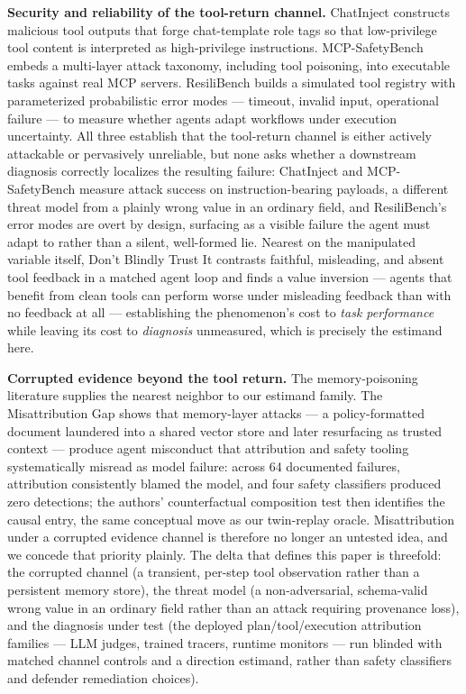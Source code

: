 \documentclass[11pt]{article}
\begin{document}
\textbf{Security and reliability of the tool-return channel.} ChatInject \citep{ChatInjectWVhgFSKniL} constructs malicious tool outputs that forge chat-template role tags so that low-privilege tool content is interpreted as high-privilege instructions. MCP-SafetyBench \citep{MCPSafetyBench7XYjeL46co} embeds a multi-layer attack taxonomy, including tool poisoning, into executable tasks against real MCP servers. ResiliBench \citep{ResiliBenchKTZ56LG7jZ} builds a simulated tool registry with parameterized probabilistic error modes --- timeout, invalid input, operational failure --- to measure whether agents adapt workflows under execution uncertainty. All three establish that the tool-return channel is either actively attackable or pervasively unreliable, but none asks whether a downstream diagnosis correctly localizes the resulting failure: ChatInject and MCP-SafetyBench measure attack success on instruction-bearing payloads, a different threat model from a plainly wrong value in an ordinary field, and ResiliBench's error modes are overt by design, surfacing as a visible failure the agent must adapt to rather than a silent, well-formed lie. Nearest on the manipulated variable itself, Don't Blindly Trust It \citep{DontBlindlyTrust260621409} contrasts faithful, misleading, and absent tool feedback in a matched agent loop and finds a value inversion --- agents that benefit from clean tools can perform worse under misleading feedback than with no feedback at all --- establishing the phenomenon's cost to \emph{task performance} while leaving its cost to \emph{diagnosis} unmeasured, which is precisely the estimand here.

\textbf{Corrupted evidence beyond the tool return.} The memory-poisoning literature supplies the nearest neighbor to our estimand family. The Misattribution Gap \citep{MisattributionGap260522842} shows that memory-layer attacks --- a policy-formatted document laundered into a shared vector store and later resurfacing as trusted context --- produce agent misconduct that attribution and safety tooling systematically misread as model failure: across 64 documented failures, attribution consistently blamed the model, and four safety classifiers produced zero detections; the authors' counterfactual composition test then identifies the causal entry, the same conceptual move as our twin-replay oracle. Misattribution under a corrupted evidence channel is therefore no longer an untested idea, and we concede that priority plainly. The delta that defines this paper is threefold: the corrupted channel (a transient, per-step tool observation rather than a persistent memory store), the threat model (a non-adversarial, schema-valid wrong value in an ordinary field rather than an attack requiring provenance loss), and the diagnosis under test (the deployed plan/tool/execution attribution families --- LLM judges, trained tracers, runtime monitors --- run blinded with matched channel controls and a direction estimand, rather than safety classifiers and defender remediation choices).
\end{document}
